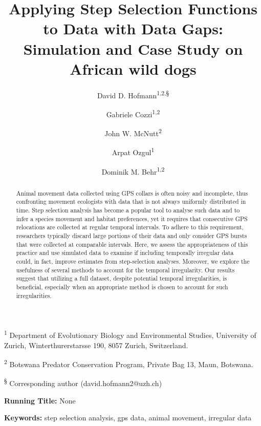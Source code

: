 \documentclass[abstract=on,10pt,a4paper,bibliography=totocnumbered]{article}
\title{Applying Step Selection Functions to Data with Data Gaps: Simulation and
Case Study on African wild dogs}
\author{
  David D. Hofmann\textsuperscript{1,2,\S} \and
  Gabriele Cozzi\textsuperscript{1,2} \and
  John W. McNutt\textsuperscript{2} \and
  Arpat Ozgul\textsuperscript{1} \and
  Dominik M. Behr\textsuperscript{1,2}
}
\begin{document}



\maketitle

\begin{flushleft}

\vspace{0.5cm}

\textsuperscript{1} Department of Evolutionary Biology and Environmental
Studies, University of Zurich, Winterthurerstarsse 190, 8057 Zurich,
Switzerland.

\textsuperscript{2} Botswana Predator Conservation Program, Private Bag 13,
Maun, Botswana.

\textsuperscript{\S} Corresponding author (david.hofmann2@uzh.ch)

\vspace{4cm}

\textbf{Running Title:} None

\vspace{0.5cm}

\textbf{Keywords:} step selection analysis, gps data, animal movement, irregular
data

\end{flushleft}

\newpage
\begin{abstract}
Animal movement data collected using GPS collars is often noisy and incomplete,
thus confronting movement ecologists with data that is not always uniformly
distributed in time. Step selection analysis has become a popular tool to
analyse such data and to infer a species movement and habitat preferences, yet
it requires that consecutive GPS relocations are collected at regular temporal
intervals. To adhere to this requirement, researchers typically discard large
portions of their data and only consider GPS bursts that were collected at
comparable intervals. Here, we assess the appropriateness of this practice and
use simulated data to examine if including temporally irregular data could, in
fact, improve estimates from step-selection analyses. Moreover, we explore the
usefulness of several methods to account for the temporal irregularity. Our
results suggest that utilizing a full dataset, despite potential temporal
irregularities, is beneficial, especially when an appropriate method is chosen
to account for such irregularities.
\end{abstract}
\end{document}
